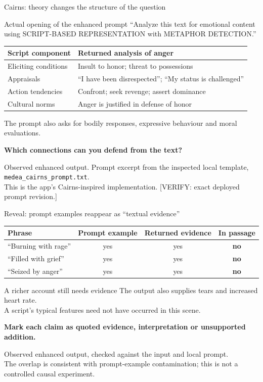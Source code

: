 \documentclass[aspectratio=169,10pt]{beamer}
\newcommand{\key}[1]{\textcolor{aegean}{\textbf{#1}}}
\newcommand{\hl}[1]{\textcolor{terracotta}{\textbf{#1}}}
\newcommand{\source}[1]{\vfill{\scriptsize\color{slate}#1\par}}
\newcommand{\question}[1]{\medskip\par\key{#1}\par}
\begin{document}
\begin{frame}{Cairns: theory changes the structure of the question}
  \begin{block}{Actual opening of the enhanced prompt}
    \small “Analyze this text for emotional content using SCRIPT-BASED REPRESENTATION with METAPHOR DETECTION.”
  \end{block}
  \small
  \begin{tabularx}{\textwidth}{@{}lX@{}}
    \toprule
    \textbf{Script component} & \textbf{Returned analysis of anger}\\
    \midrule
    Eliciting conditions & Insult to honor; threat to possessions\\
    Appraisals & “I have been disrespected”; “My status is challenged”\\
    Action tendencies & Confront; seek revenge; assert dominance\\
    Cultural norms & Anger is justified in defense of honor\\
    \bottomrule
  \end{tabularx}
  \medskip
  \normalsize The prompt also asks for bodily responses, expressive behaviour and moral evaluations.
  \question{Which connections can you defend from the text?}
  \source{Observed enhanced output. Prompt excerpt from the inspected local template, \texttt{medea\_cairns\_prompt.txt}.\\
  This is the app's Cairns-inspired implementation. [VERIFY: exact deployed prompt revision.]}
\end{frame}

\begin{frame}{Reveal: prompt examples reappear as “textual evidence”}
  \small
  \begin{tabularx}{\textwidth}{@{}Xccc@{}}
    \toprule
    \textbf{Phrase} & \textbf{Prompt example} & \textbf{Returned evidence} & \textbf{In passage}\\
    \midrule
    “Burning with rage” & yes & yes & \hl{no}\\[5pt]
    “Filled with grief” & yes & yes & \hl{no}\\[5pt]
    “Seized by anger” & yes & yes & \hl{no}\\
    \bottomrule
  \end{tabularx}
  \vspace{1em}
  \begin{block}{A richer account still needs evidence}
    The output also supplies tears and increased heart rate.\\
    A script's typical features need not have occurred in this scene.
  \end{block}
  \question{Mark each claim as quoted evidence, interpretation or unsupported addition.}
  \source{Observed enhanced output, checked against the input and local prompt.\\
  The overlap is consistent with prompt-example contamination; this is not a controlled causal experiment.}
\end{frame}
\end{document}
